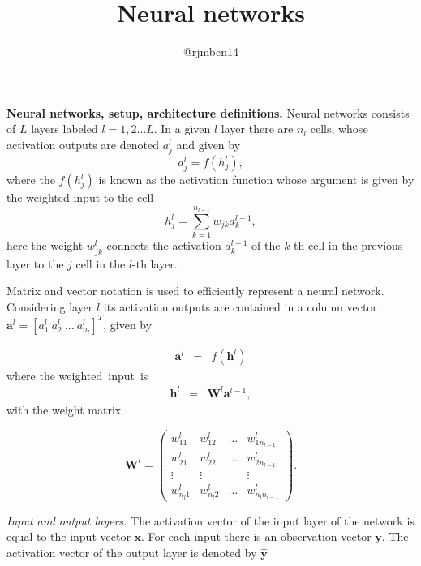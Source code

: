 \documentclass[11pt,onecolumn]{article}
\title{Neural networks}
\author{@rjmbcn14}
\begin{document}
\maketitle 

\textbf{Neural networks, setup, architecture definitions.} Neural networks consists of $L$ layers labeled $l = 1,2 ...L$. In a given $l$ layer there are $n_l$ cells, whose activation outputs are denoted $a_j^{l}$ and given by 
\begin{equation}
	a_j^{l} = f(h^l_{j}),
\end{equation}
where the $f(h^l_{j})$ is known as the activation function whose argument is given by the weighted input to the cell 
\begin{equation}
	h^l_{j} = \sum_{k=1}^{n_{l-1}} w_{jk}a^{l-1}_k,
\end{equation}
here the weight $w^{l}_{jk}$ connects the activation $a^{l-1}_k$ of the $k$-th cell in the previous layer to the $j$ cell in the $l$-th layer. 

Matrix and vector notation is used to efficiently represent a neural network. Considering layer $l$ its activation outputs are contained in a column vector $\mathbf{a}^{l} = [a^l_1 ~ a^l_2~...~a^l_{n_l}]^{T}$, given by 

\begin{eqnarray}
	\mathbf{a}^{l} &=& f\left( \mathbf{h}^{l} \right) 
\end{eqnarray}
where the weighted~input~is 
\begin{eqnarray}
	\mathbf{h}^{l}   &=& \mathbf{W}^{l} \mathbf{a}^{l-1},
\end{eqnarray} 
with the weight matrix 

\begin{equation}
	\mathbf{W}^{l} = \left(\begin{array}{cccc} w_{11}^{l} & w_{12}^{l} & \hdots & w_{1n_{l-1}}^{l} \\ 
	w_{21}^{l} & w_{22}^{l} &\hdots & w_{2{n_{l-1}}}^{l}  \\
	\vdots & \vdots & &\vdots \\
	w_{n_{l}1}^{l} & w_{n_{l}2}^{l} &\hdots & w_{n_{l}{n_{l-1}}}^{l} 
	\end{array}\right).
\end{equation}

\textit{Input and output layers.} The activation vector of the input layer of the network is equal to the input vector $\mathbf{x}$. For each input there is an observation vector $\mathbf{y}$. The activation vector of the output layer is denoted by $\mathbf{\hat{y}}$
\end{document}
